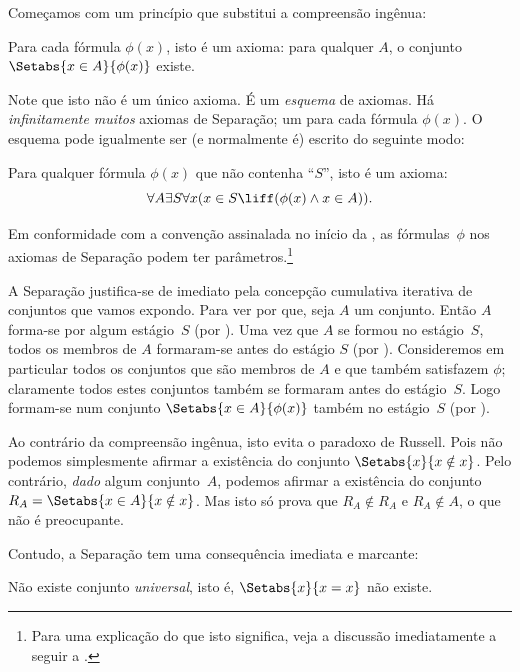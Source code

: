 \documentclass[../../../include/open-logic-section]{subfiles}
\begin{document}

Começamos com um princípio que substitui a compreensão ingênua:

\begin{axiom} Para cada fórmula $\phi(x)$, isto é um
axioma: para qualquer $A$, o conjunto $\Setabs{x \in A}{\phi(x)}$ existe.
\end{axiom}

Note que isto não é um único axioma. É um \emph{esquema} de axiomas.
Há \emph{infinitamente muitos} axiomas de Separação; um para cada
fórmula $\phi(x)$. O esquema pode igualmente ser (e normalmente é)
escrito do seguinte modo:

\begin{defish}
Para qualquer fórmula $\phi(x)$ que não contenha ``$S$'', isto é um
axioma:
\[
	\forall A \exists S \forall x(x \in S \liff (\phi(x) \land x \in A)).
\]
\end{defish}

Em conformidade com a convenção assinalada no início da
, as fórmulas~$\phi$ nos axiomas de Separação
podem ter parâmetros.\footnote{Para uma explicação do que isto significa,
veja a discussão imediatamente a seguir a
.}

A Separação justifica-se de imediato pela concepção cumulativa iterativa
de conjuntos que vamos expondo. Para ver por que, seja $A$ um conjunto.
Então $A$ forma-se por algum estágio~$S$ (por \stageshier). Uma vez que $A$ se formou no estágio~$S$, todos os membros de $A$ formaram-se antes do estágio $S$
(por \stagesacc). Consideremos em particular todos os conjuntos que são
membros de $A$ e que também satisfazem $\phi$; claramente todos estes
conjuntos também se formaram antes do estágio~$S$. Logo formam-se num conjunto
$\Setabs{x \in A}{\phi(x)}$ também no estágio~$S$ (por \stagesacc).

Ao contrário da compreensão ingênua, isto evita o paradoxo de Russell. Pois não
podemos simplesmente afirmar a existência do conjunto $\Setabs{x}{x \notin
x}$. Pelo contrário, \emph{dado} algum conjunto~$A$, podemos afirmar a existência do
conjunto $R_A = \Setabs{x \in A}{x \notin x}$. Mas isto só prova que
$R_A \notin R_A$ e $R_A \notin A$, o que não é preocupante.

Contudo, a Separação tem uma consequência imediata e marcante:

\begin{thm}
Não existe conjunto \emph{universal}, isto é, $\Setabs{x}{x = x}$ não existe.
\end{thm}
\end{document}
